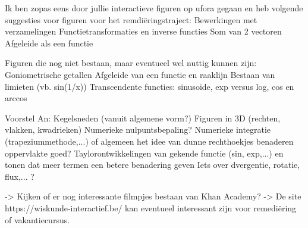 Ik ben zopas eens door jullie interactieve figuren op ufora gegaan en heb volgende suggesties voor figuren voor het remdiëringstraject:
Bewerkingen met verzamelingen
Functietransformaties en inverse functies 
Som van 2 vectoren
Afgeleide als een functie

Figuren die nog niet bestaan, maar eventueel wel nuttig kunnen zijn:
Goniometrische getallen
Afgeleide van een functie en raaklijn
Bestaan van limieten (vb. sin(1/x))
Transcendente functies: sinusoide, exp versus log, cos en arccos

Voorstel An:
Kegelsneden (vanuit algemene vorm?)
Figuren in 3D (rechten, vlakken, kwadrieken)
Numerieke nulpuntsbepaling?
Numerieke integratie (trapeziummethode,...) of algemeen het idee van dunne rechthoekjes benaderen oppervlakte goed?
Taylorontwikkelingen van gekende functie (sin, exp,...) en tonen dat meer termen een betere benadering geven
Iets over dvergentie, rotatie, flux,... ?

-> Kijken of er nog interessante filmpjes bestaan van Khan Academy?
-> De site https://wiskunde-interactief.be/ kan eventueel interessant zijn voor remediëring of vakantiecursus.